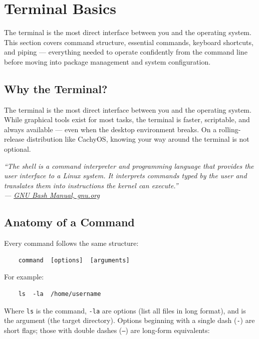 \documentclass{article}
\newcommand{\code}[1]{\colorbox{codebg}{\texttt{#1}}}
\begin{document}
\section{Terminal Basics}

The terminal is the most direct interface between you and the operating system. This
section covers command structure, essential commands, keyboard shortcuts, and piping
--- everything needed to operate confidently from the command line before moving into
package management and system configuration.

\subsection{Why the Terminal?}

The terminal is the most direct interface between you and the operating system. While
graphical tools exist for most tasks, the terminal is faster, scriptable, and always
available --- even when the desktop environment breaks. On a rolling-release
distribution like CachyOS, knowing your way around the terminal is not optional.

\begin{mdframed}[linewidth=1.5pt, linecolor=black!50, topline=true, bottomline=true,
	leftline=false, rightline=false, backgroundcolor=black!3]
	\small\itshape
	``The shell is a command interpreter and programming language that provides the
	user interface to a Linux system. It interprets commands typed by the user
	and translates them into instructions the kernel can execute.''\\[4pt]
	\normalfont\small ---
	\href{https://www.gnu.org/software/bash/manual/bash.html}{GNU Bash Manual,
		gnu.org}
\end{mdframed}

\subsection{Anatomy of a Command}

Every command follows the same structure:

\begin{verbatim}
	command  [options]  [arguments]
\end{verbatim}

For example:

\begin{verbatim}
	ls  -la  /home/username
\end{verbatim}

Where \code{ls} is the command, \code{-la} are options (list all files in long
format), and  is the argument (the target directory).
Options beginning with a single dash (\code{-}) are short flags; those with double
dashes (\code{--}) are long-form equivalents:
\end{document}
